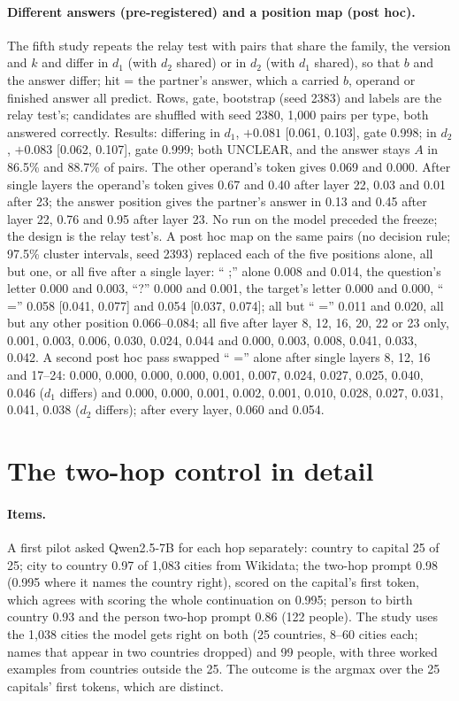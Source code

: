 \documentclass{article}
\begin{document}
\paragraph{Different answers (pre-registered) and a position map (post hoc).} The fifth study repeats the relay test with pairs that share the family, the version and $k$ and differ in $d_1$ (with $d_2$ shared) or in $d_2$ (with $d_1$ shared), so that $b$ and the answer differ; hit = the partner's answer, which a carried $b$, operand or finished answer all predict. Rows, gate, bootstrap (seed 2383) and labels are the relay test's; candidates are shuffled with seed 2380, 1,000 pairs per type, both answered correctly. Results: differing in $d_1$, $+0.081$ [0.061, 0.103], gate 0.998; in $d_2$, $+0.083$ [0.062, 0.107], gate 0.999; both UNCLEAR, and the answer stays $A$ in 86.5\% and 88.7\% of pairs. The other operand's token gives 0.069 and 0.000. After single layers the operand's token gives 0.67 and 0.40 after layer 22, 0.03 and 0.01 after 23; the answer position gives the partner's answer in 0.13 and 0.45 after layer 22, 0.76 and 0.95 after layer 23. No run on the model preceded the freeze; the design is the relay test's. A post hoc map on the same pairs (no decision rule; 97.5\% cluster intervals, seed 2393) replaced each of the five positions alone, all but one, or all five after a single layer: `` ;'' alone 0.008 and 0.014, the question's letter 0.000 and 0.003, ``?'' 0.000 and 0.001, the target's letter 0.000 and 0.000, `` ='' 0.058 [0.041, 0.077] and 0.054 [0.037, 0.074]; all but `` ='' 0.011 and 0.020, all but any other position 0.066--0.084; all five after layer 8, 12, 16, 20, 22 or 23 only, 0.001, 0.003, 0.006, 0.030, 0.024, 0.044 and 0.000, 0.003, 0.008, 0.041, 0.033, 0.042. A second post hoc pass swapped `` ='' alone after single layers 8, 12, 16 and 17--24: 0.000, 0.000, 0.000, 0.000, 0.001, 0.007, 0.024, 0.027, 0.025, 0.040, 0.046 ($d_1$ differs) and 0.000, 0.000, 0.001, 0.002, 0.001, 0.010, 0.028, 0.027, 0.031, 0.041, 0.038 ($d_2$ differs); after every layer, 0.060 and 0.054.

\section{The two-hop control in detail}\label{app:twohop}

\paragraph{Items.} A first pilot asked Qwen2.5-7B for each hop separately: country to capital 25 of 25; city to country 0.97 of 1,083 cities from Wikidata; the two-hop prompt 0.98 (0.995 where it names the country right), scored on the capital's first token, which agrees with scoring the whole continuation on 0.995; person to birth country 0.93 and the person two-hop prompt 0.86 (122 people). The study uses the 1,038 cities the model gets right on both (25 countries, 8--60 cities each; names that appear in two countries dropped) and 99 people, with three worked examples from countries outside the 25. The outcome is the argmax over the 25 capitals' first tokens, which are distinct.
\end{document}
